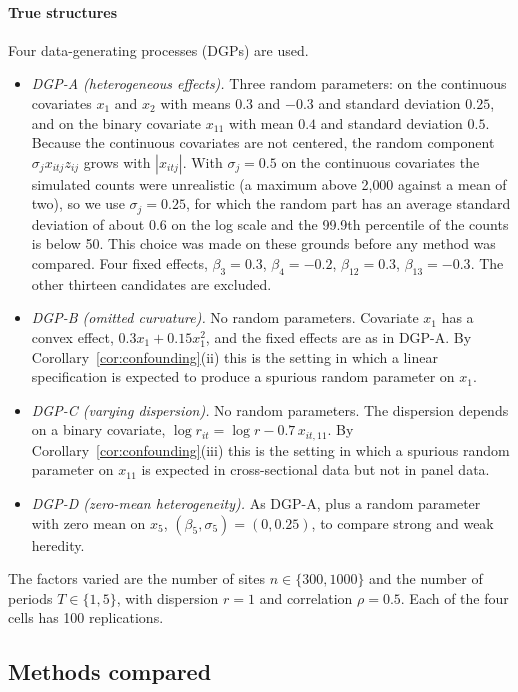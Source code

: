 \paragraph{True structures} Four data-generating processes (DGPs) are used.
\begin{itemize}[leftmargin=*]
\item \emph{DGP-A (heterogeneous effects).} Three random parameters: on the continuous covariates $x_1$ and $x_2$ with means $0.3$ and $-0.3$ and standard deviation $0.25$, and on the binary covariate $x_{11}$ with mean $0.4$ and standard deviation $0.5$. Because the continuous covariates are not centered, the random component $\sigma_jx_{itj}z_{ij}$ grows with $|x_{itj}|$. With $\sigma_j=0.5$ on the continuous covariates the simulated counts were unrealistic (a maximum above 2{,}000 against a mean of two), so we use $\sigma_j=0.25$, for which the random part has an average standard deviation of about $0.6$ on the log scale and the 99.9th percentile of the counts is below 50. This choice was made on these grounds before any method was compared. Four fixed effects, $\beta_3=0.3$, $\beta_4=-0.2$, $\beta_{12}=0.3$, $\beta_{13}=-0.3$. The other thirteen candidates are excluded.
\item \emph{DGP-B (omitted curvature).} No random parameters. Covariate $x_1$ has a convex effect, $0.3x_1+0.15x_1^2$, and the fixed effects are as in DGP-A. By Corollary~\ref{cor:confounding}(ii) this is the setting in which a linear specification is expected to produce a spurious random parameter on $x_1$.
\item \emph{DGP-C (varying dispersion).} No random parameters. The dispersion depends on a binary covariate, $\log r_{it}=\log r-0.7\,x_{it,11}$. By Corollary~\ref{cor:confounding}(iii) this is the setting in which a spurious random parameter on $x_{11}$ is expected in cross-sectional data but not in panel data.
\item \emph{DGP-D (zero-mean heterogeneity).} As DGP-A, plus a random parameter with zero mean on $x_5$, $(\beta_5,\sigma_5)=(0,0.25)$, to compare strong and weak heredity.
\end{itemize}
The factors varied are the number of sites $n\in\{300,1000\}$ and the number of periods $T\in\{1,5\}$, with dispersion $r=1$ and correlation $\rho=0.5$. Each of the four cells has 100 replications. 

\subsection{Methods compared}

